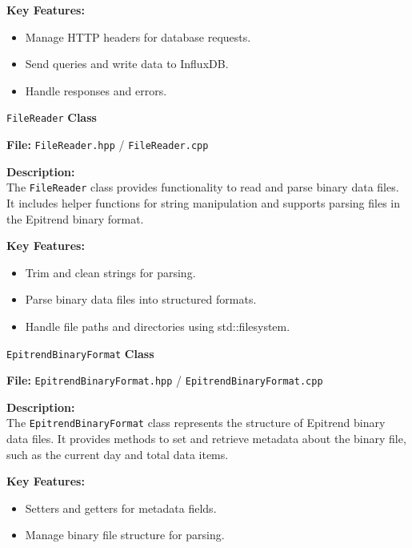 \documentclass{article}
\begin{document}
\vspace{5pt}
\noindent
\textbf{Key Features:}
\begin{itemize}
    \item Manage HTTP headers for database requests.
    \item Send queries and write data to InfluxDB.
    \item Handle responses and errors.
\end{itemize}

\vspace{15pt}
\noindent
\texttt{FileReader} \textbf{Class}

\vspace{5pt}
\noindent
\textbf{File:} \texttt{FileReader.hpp} / \texttt{FileReader.cpp} 

\vspace{5pt}
\noindent
\textbf{Description:}
\\
\noindent
The \texttt{FileReader} class provides functionality to read and parse binary data files. It includes helper functions for string manipulation and supports parsing files in the Epitrend binary format.

\vspace{5pt}
\noindent
\textbf{Key Features:}
\begin{itemize}
    \item Trim and clean strings for parsing.
    \item Parse binary data files into structured formats.
    \item Handle file paths and directories using std::filesystem.
\end{itemize}

\vspace{15pt}
\noindent
\texttt{EpitrendBinaryFormat} \textbf{Class}

\vspace{5pt}
\noindent
\textbf{File:} \texttt{EpitrendBinaryFormat.hpp} / \texttt{EpitrendBinaryFormat.cpp} 

\vspace{5pt}
\noindent
\textbf{Description:}
\\
\noindent
The \texttt{EpitrendBinaryFormat} class represents the structure of Epitrend binary data files. It provides methods to set and retrieve metadata about the binary file, such as the current day and total data items.

\vspace{5pt}
\noindent
\textbf{Key Features:}
\begin{itemize}
    \item Setters and getters for metadata fields.
    \item Manage binary file structure for parsing.
\end{itemize}
\end{document}
